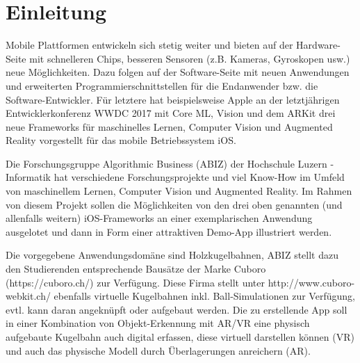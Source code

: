 \section{Einleitung}

Mobile Plattformen entwickeln sich stetig weiter und bieten auf der Hardware-Seite mit schnelleren Chips, besseren Sensoren (z.B. Kameras, Gyroskopen usw.) neue Möglichkeiten. Dazu folgen auf der Software-Seite mit neuen Anwendungen und erweiterten Programmierschnittstellen für die Endanwender bzw. die Software-Entwickler. Für letztere hat beispielsweise Apple an der letztjährigen Entwicklerkonferenz WWDC 2017 mit Core ML, Vision und dem ARKit drei neue Frameworks für maschinelles Lernen, Computer Vision und Augmented Reality vorgestellt für das mobile Betriebssystem iOS.


Die Forschungsgruppe Algorithmic Business (ABIZ) der Hochschule Luzern - Informatik hat verschiedene Forschungsprojekte und viel Know-How im Umfeld von maschinellem Lernen, Computer Vision und Augmented Reality. Im Rahmen von diesem Projekt sollen die Möglichkeiten von den drei oben genannten (und allenfalls weitern) iOS-Frameworks an einer exemplarischen Anwendung ausgelotet und dann in Form einer attraktiven Demo-App illustriert werden.


Die vorgegebene Anwendungsdomäne sind Holzkugelbahnen, ABIZ stellt dazu den Studierenden entsprechende Bausätze der Marke Cuboro (https://cuboro.ch/) zur Verfügung. Diese Firma stellt unter http://www.cuboro-webkit.ch/ ebenfalls virtuelle Kugelbahnen inkl. Ball-Simulationen zur Verfügung, evtl. kann daran angeknüpft oder aufgebaut werden. Die zu erstellende App soll in einer Kombination von Objekt-Erkennung mit AR/VR eine physisch aufgebaute Kugelbahn auch digital erfassen, diese virtuell darstellen können (VR) und auch das physische Modell durch Überlagerungen anreichern (AR).